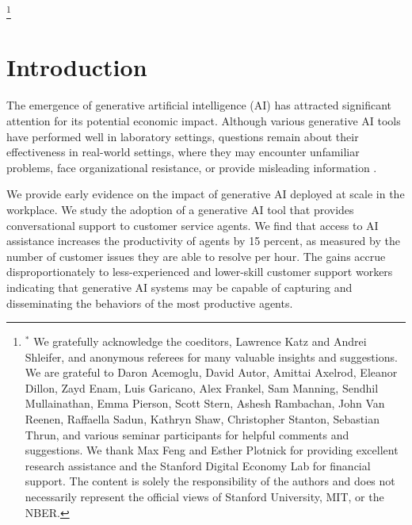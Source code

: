 \documentclass[11pt]{article}
\begin{document}



\let\thefootnote\relax\footnote{$^{*}$%
We gratefully acknowledge the coeditors, Lawrence Katz and Andrei Shleifer, and anonymous referees for many valuable insights and suggestions. We are grateful to Daron Acemoglu, David Autor, Amittai Axelrod, Eleanor Dillon, Zayd Enam, Luis Garicano, Alex Frankel, Sam Manning, Sendhil Mullainathan, Emma Pierson, Scott Stern, Ashesh Rambachan, John Van Reenen, Raffaella Sadun, Kathryn Shaw, Christopher Stanton, Sebastian Thrun, and various seminar participants for helpful comments and suggestions. We thank Max Feng and Esther Plotnick for providing excellent research assistance and the Stanford Digital Economy Lab for financial support. The content is solely the responsibility of the authors and does not necessarily represent the official views of Stanford University, MIT, or the NBER. }

\linespread{1.5}
\setcounter{page}{0}

\newpage
\section{Introduction}
The emergence of generative artificial intelligence (AI) has attracted significant attention for its potential economic impact.  Although various generative AI tools have performed well in laboratory settings, questions remain about their effectiveness in real-world settings, where they may encounter unfamiliar problems, face organizational resistance, or provide misleading information \citep{peng2023check, rooseConversationBingChatbot2023}.

We provide early evidence on the impact of generative AI deployed at scale in the workplace. We study the adoption of a generative AI tool that provides conversational support to customer service agents. We find that access to AI assistance increases the productivity of agents by 15 percent, as measured by the number of customer issues they are able to resolve per hour. The gains accrue disproportionately to less-experienced and lower-skill customer support workers indicating that generative AI systems may be capable of capturing and disseminating the behaviors of the most productive agents.
\end{document}
